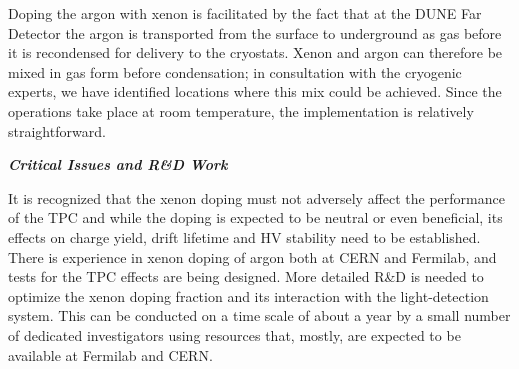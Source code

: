 Doping the argon with xenon is facilitated by the fact that at the DUNE Far Detector the argon is transported from the surface to underground as gas before it is recondensed for delivery to the cryostats. Xenon and argon can therefore be mixed in gas form before condensation;  in consultation with the cryogenic experts, we have identified locations where this mix could be achieved. Since the operations take place at room temperature, the implementation is relatively straightforward.



{\it\bf Critical Issues and R\&D Work}

It is recognized that the xenon doping must not adversely affect the performance of the TPC and while the doping is expected to be neutral or even beneficial, its effects on charge yield, drift lifetime and HV stability need to be established.  There is experience in xenon doping of argon both at CERN and Fermilab, and tests for the TPC effects are being designed.  
More detailed R\&D is needed to optimize the xenon doping fraction and its interaction with the light-detection system. This can be conducted on a time scale of about a year by a small number of dedicated investigators using resources that, mostly, are expected to be available at Fermilab and CERN. 


